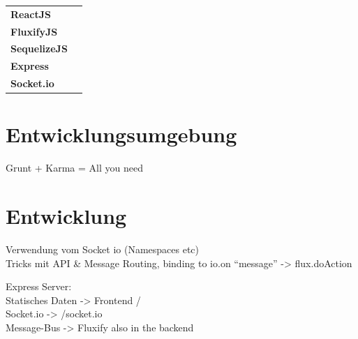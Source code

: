 \documentclass[oneside,11pt,parskip=half,ngerman]{scrreprt}
\begin{document}
\begin{longtable}[c]{@{}ll@{}}
\begin{minipage}[t]{0.26\columnwidth}
\textbf{ReactJS}
\strut\end{minipage} &
\begin{minipage}[t]{0.63\columnwidth}\raggedright\strut
\strut\end{minipage}\tabularnewline
\begin{minipage}[t]{0.26\columnwidth}\raggedright\strut
\textbf{FluxifyJS}
\strut\end{minipage} &
\begin{minipage}[t]{0.63\columnwidth}\raggedright\strut
\strut\end{minipage}\tabularnewline
\begin{minipage}[t]{0.26\columnwidth}\raggedright\strut
\textbf{SequelizeJS}
\strut\end{minipage} &
\begin{minipage}[t]{0.63\columnwidth}\raggedright\strut
\strut\end{minipage}\tabularnewline
\begin{minipage}[t]{0.26\columnwidth}\raggedright\strut
\textbf{Express}
\strut\end{minipage} &
\begin{minipage}[t]{0.63\columnwidth}\raggedright\strut
\strut\end{minipage}\tabularnewline
\begin{minipage}[t]{0.26\columnwidth}\raggedright\strut
\textbf{Socket.io}
\strut\end{minipage} &
\begin{minipage}[t]{0.63\columnwidth}\raggedright\strut
\strut\end{minipage}\tabularnewline
\bottomrule
\end{longtable}

\section{Entwicklungsumgebung}\label{entwicklungsumgebung}

Grunt + Karma = All you need

\section{Entwicklung}\label{entwicklung}

Verwendung vom Socket io (Namespaces etc)\\Tricks mit API \& Message
Routing, binding to io.on \enquote{message} -\textgreater{}
flux.doAction

Express Server:\\Statisches Daten -\textgreater{} Frontend /\\Socket.io
-\textgreater{} /socket.io\\Message-Bus -\textgreater{} Fluxify also in
the backend
\end{document}
